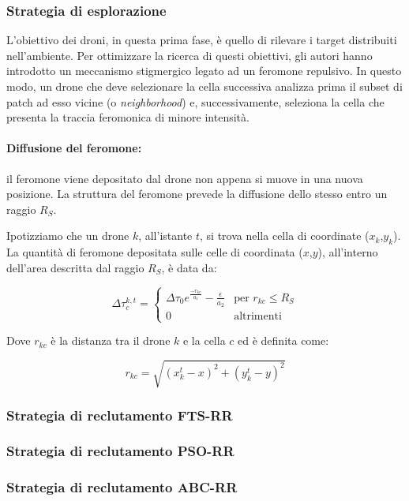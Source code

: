 \subsubsection{Strategia di esplorazione}

L'obiettivo dei droni, in questa prima fase, è quello di rilevare i target distribuiti nell'ambiente.
Per ottimizzare la ricerca di questi obiettivi, gli autori hanno introdotto un meccanismo stigmergico legato ad un feromone repulsivo.
In questo modo, un drone che deve selezionare la cella successiva analizza prima il subset di patch ad esso vicine (o \textit{neighborhood}) e, successivamente, seleziona la cella che presenta la traccia feromonica di minore intensità.

\paragraph{Diffusione del feromone:} il feromone viene depositato dal drone non appena si muove in una nuova posizione.
La struttura del feromone prevede la diffusione dello stesso entro un raggio $R_S$.

Ipotizziamo che un drone $k$, all'istante $t$, si trova nella cella di coordinate ($x_k$,$y_k$).
La quantità di feromone depositata sulle celle di coordinata ($x$,$y$), all'interno dell'area descritta dal raggio $R_S$, è data da:

\begin{equation}
    \Delta\tau_{c}^{k,t} = 
    \begin{cases}
        \Delta\tau_{0}e^{\frac{-r_{kc}}{a_1}} - \frac{\epsilon}{a_2} &\text{per $r_{kc} \leq R_S$}\\
        0 &\text{altrimenti}
    \end{cases}
\end{equation}

Dove $r_{kc}$ è la distanza tra il drone $k$ e la cella $c$ ed è definita come:

\begin{equation}
    r_{kc} = \sqrt{(x^{t}_{k} - x)^{2} + (y^{t}_{k} - y)^{2}}
\end{equation}




\subsubsection{Strategia di reclutamento FTS-RR}

\subsubsection{Strategia di reclutamento PSO-RR}

\subsubsection{Strategia di reclutamento ABC-RR}